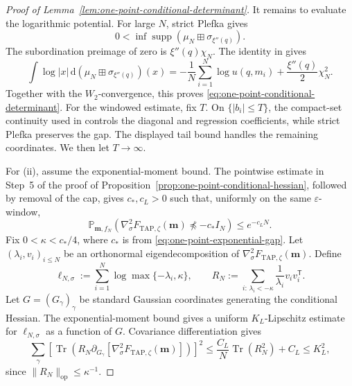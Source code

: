 \documentclass[a4paper,10pt,reqno]{amsart}
\numberwithin{equation}{section}
\newcommand{\ve}{\varepsilon}
\newcommand{\dP}{\mathbb{P}}%
\newcommand{\dd}{\mathrm{d}}
\newcommand{\TAP}{\mathrm{TAP}}
\newcommand{\bfm}{\mathbf{m}}
\begin{document}
\begin{proof}[Proof of Lemma~\ref{lem:one-point-conditional-determinant}]
		It remains to evaluate the logarithmic potential. For large \(N\),
		strict Plefka gives
		\[
		0<\inf\operatorname{supp}
		\left(\mu_N\boxplus\sigma_{\xi''(q)}\right).
		\]
		The subordination preimage of zero is \(\xi''(q)\chi_N\).
		The identity in \cite[Lemma~C.3]{TAPIsing} gives
		\[
		\int\log|x|\,\dd
		\left(\mu_N\boxplus\sigma_{\xi''(q)}\right)(x)
		=
		-\frac1N\sum_{i=1}^N\log u(q,m_i)
		+\frac{\xi''(q)}2\chi_N^2.
		\]
		Together with the \(W_2\)-convergence, this proves
		\eqref{eq:one-point-conditional-determinant}.
		For the windowed estimate, fix \(T\). On \(\{|b_i|\le T\}\), the
		compact-set continuity used in \cite[Proof of Lemma~C.4]{TAPIsing}
		controls the diagonal and regression coefficients, while strict Plefka
		preserves the gap. The displayed tail bound handles the remaining
		coordinates. We then let \(T\to\infty\).
		
		For \textup{(ii)}, assume the exponential-moment bound. The pointwise
		estimate in Step~5 of the proof of
		Proposition~\ref{prop:one-point-conditional-hessian}, followed by removal
		of the cap, gives
		\(c_*,c_L>0\) such that, uniformly on the same \(\ve\)-window,
		\begin{equation}\label{eq:one-point-exponential-gap}
			\dP_{\bfm,f_N}\left(
			\nabla_\sigma^2F_{\TAP,\zeta}(\bfm)
			\not\preceq-c_*I_N
			\right)
			\le e^{-c_LN}.
		\end{equation}
		Fix \(0<\kappa<c_*/4\), where \(c_*\) is from
		\eqref{eq:one-point-exponential-gap}. Let
		\((\lambda_i,v_i)_{i\le N}\) be an orthonormal eigendecomposition of
		\(\nabla_\sigma^2F_{\TAP,\zeta}(\bfm)\). Define
		\[
		\ell_{N,\sigma}
		:=
		\sum_{i=1}^N
		\log\max\{-\lambda_i,\kappa\},
		\qquad
		R_N
		:=
		\sum_{i:\,\lambda_i<-\kappa}
		\frac1{\lambda_i}v_iv_i^{\mathsf T}.
		\]
		Let \(G=(G_\gamma)_\gamma\) be standard Gaussian coordinates generating
		the conditional Hessian.
		The exponential-moment bound gives a uniform \(K_L\)-Lipschitz estimate
		for \(\ell_{N,\sigma}\) as a function of \(G\). Covariance
		differentiation gives
		\[
		\sum_\gamma
		\left[
		\operatorname{Tr}\left(
		R_N\partial_{G_\gamma}
		\left[\nabla_\sigma^2F_{\TAP,\zeta}(\bfm)\right]
		\right)
		\right]^2
		\le
		\frac{C_L}{N}\operatorname{Tr}(R_N^2)+C_L
		\le K_L^2,
		\]
		since \(\|R_N\|_{\mathrm{op}}\le\kappa^{-1}\).
		

\end{proof}
\end{document}
